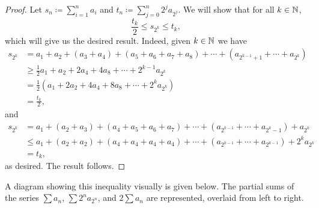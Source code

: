 \documentclass[../analysis1.tex]{subfiles}
\begin{document}
\begin{proof}
    Let $s_n\coloneqq \sum_{i=1}^n a_i$ and $t_n\coloneqq \sum_{j=0}^n2^ja_{2^j}$. We will show that for all $k\in\mathbb{N}$, $$\frac{t_k}{2}\le s_{2^k}\le t_k,$$which will give us the desired result. Indeed, given $k\in\mathbb{N}$ we have
    \begin{align*}
        s_{2^k}&=a_1+a_2+(a_3+a_4)+(a_5+a_6+a_7+a_8)+\cdots+\left(a_{2^{k-1}+1}+\cdots+a_{2^k}\right)\\
        &\ge \frac{1}{2}a_1+a_2+2a_4+4a_8+\cdots+2^{k-1}a_{2^k}\\
        &=\frac{1}{2}\left(a_1+2a_2+4a_4+8a_8+\cdots+2^{k}a_{2^k}\right)\\
        &=\frac{t_k}{2},
    \end{align*}
    and
    \begin{align*}
        s_{2^k}&=a_1+(a_2+a_3)+(a_4+a_5+a_6+a_7)+\cdots+\left(a_{2^{k-1}}+\cdots+a_{2^{k}-1}\right)+a_{2^k}\\
        &\le a_1+(a_2+a_2)+(a_4+a_4+a_4+a_4)+\cdots+\left(a_{2^{k-1}}+\cdots+a_{2^{k-1}}\right)+2^ka_{2^k}\\
        &=t_k,
    \end{align*}
    as desired. The result follows.\qedhere
\end{proof}

A diagram showing this inequality visually is given below. The partial sums of the series $\sum a_n$, $\sum 2^na_{2^n}$, and $2\sum a_n$ are represented, overlaid from left to right.
\end{document}
